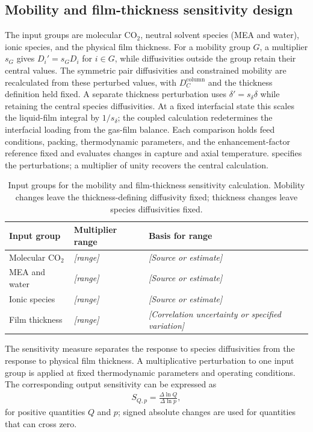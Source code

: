 \subsection{Mobility and film-thickness sensitivity design}\label{subsec:film-sensitivity-design}
The input groups are molecular CO$_2$, neutral solvent species (MEA and water), ionic species, and the physical film thickness.
For a mobility group $G$, a multiplier $s_G$ gives $D_i'=s_GD_i$ for $i\in G$, while diffusivities outside the group retain their central values.
The symmetric pair diffusivities and constrained mobility are recalculated from these perturbed values, with $D_C^{\mathrm{column}}$ and the thickness definition held fixed.
A separate thickness perturbation uses $\delta'=s_\delta\delta$ while retaining the central species diffusivities.
At a fixed interfacial state this scales the liquid-film integral by $1/s_\delta$; the coupled calculation redetermines the interfacial loading from the gas-film balance.
Each comparison holds feed conditions, packing, thermodynamic parameters, and the enhancement-factor reference fixed and evaluates changes in capture and axial temperature.
 specifies the perturbations; a multiplier of unity recovers the central calculation.

\begin{table}[pos=htbp]
\centering\small
\caption{Input groups for the mobility and film-thickness sensitivity calculation. Mobility changes leave the thickness-defining diffusivity fixed; thickness changes leave species diffusivities fixed.}
\label{tab:sensitivity-inputs}
\begin{tabularx}{\linewidth}{@{}llX@{}}
\toprule
Input group & Multiplier range & Basis for range\\
\midrule
Molecular CO$_2$ & \textit{[range]} & \textit{[Source or estimate]}\\
MEA and water & \textit{[range]} & \textit{[Source or estimate]}\\
Ionic species & \textit{[range]} & \textit{[Source or estimate]}\\
Film thickness & \textit{[range]} & \textit{[Correlation uncertainty or specified variation]}\\
\bottomrule
\end{tabularx}
\end{table}

The sensitivity measure separates the response to species diffusivities from the response to physical film thickness.
A multiplicative perturbation to one input group is applied at fixed thermodynamic parameters and operating conditions.
The corresponding output sensitivity can be expressed as
\begin{align}
S_{Q,p}=\frac{\Delta\ln Q}{\Delta\ln p},\label{eq:film-input-sensitivity}
\end{align}
for positive quantities $Q$ and $p$; signed absolute changes are used for quantities that can cross zero.

